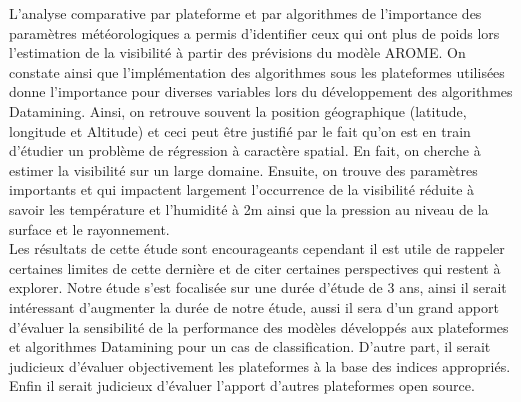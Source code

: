 L’analyse  comparative  par plateforme et par algorithmes  de l'importance des paramètres météorologiques a permis d'identifier ceux qui ont plus de poids lors l’estimation de la visibilité à partir des  prévisions  du  modèle  AROME. On constate ainsi que l’implémentation des algorithmes sous les plateformes utilisées donne l’importance pour diverses variables lors du développement des algorithmes Datamining. Ainsi, on retrouve souvent la position géographique
(latitude, longitude et Altitude) et ceci peut être justifié par le fait qu’on est en train d’étudier un problème de régression à caractère spatial. En fait, on cherche à estimer la visibilité sur un large domaine. Ensuite, on trouve des paramètres importants et qui impactent largement l’occurrence de la visibilité réduite à savoir les température et l’humidité à 2m ainsi que la pression au niveau de la surface et le rayonnement.\\

Les résultats de cette étude sont encourageants cependant il est utile de rappeler certaines limites de cette dernière et de citer certaines perspectives qui restent à explorer. Notre étude s’est focalisée sur une durée d'étude de 3 ans, ainsi il serait intéressant d’augmenter la durée de notre étude, aussi il sera d'un grand apport d'évaluer la sensibilité de la performance des modèles développés aux plateformes et algorithmes Datamining pour un cas de classification. D'autre part, il serait judicieux d'évaluer objectivement les plateformes à la base des indices appropriés. Enfin il serait judicieux d’évaluer l’apport d’autres plateformes open source.
